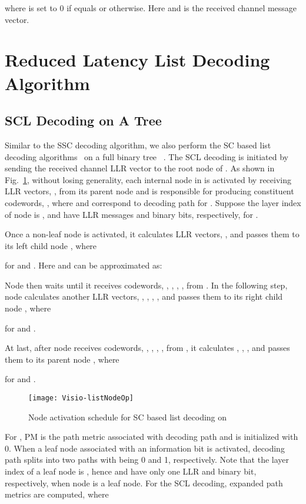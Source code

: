 \documentclass[journal]{IEEEtran}
\begin{document}
where  is set to 0 if  equals  or  otherwise. Here  and  is the received channel message vector.
\section{Reduced Latency List Decoding Algorithm}
\label{sec: rlld}

\subsection{SCL Decoding on A Tree}\label{ssec:node_activation}
Similar to the SSC decoding algorithm, we also perform the SC based list decoding algorithms~\cite{ido_it, tree_list_dec} on a full binary tree ~\cite{jun_sips, gabi_low_latency}. The SCL decoding is initiated by sending the received channel LLR vector to the root node of . As shown in Fig.~\ref{fig: list_node_op}, without losing generality, each internal node  in  is activated by receiving  LLR vectors, , from its parent node  and is responsible for producing  constituent codewords, , where  and  correspond to decoding path  for . Suppose the layer index of node  is ,  and  have  LLR messages and binary bits, respectively, for .

Once a non-leaf node  is activated, it calculates  LLR vectors, , and passes them to its left child node , where

for  and . Here  and can be approximated as:


Node  then waits until it receives  codewords, , , , , from . In the following step, node  calculates another  LLR vectors, , , , , and passes them to its right child node , where

for  and .

At last, after node  receives  codewords, , , , , from , it calculates , , ,  and passes them to its parent node , where

for  and .

\begin{figure} [hbt]
\centering
\texttt{[image: Visio-listNodeOp]}
  \caption{Node activation schedule for SC based list decoding on }\label{fig: list_node_op}
\end{figure}

For , PM is the path metric associated with decoding path  and is initialized with 0.
When a leaf node  associated with an information bit is activated, decoding path  splits into two paths with  being 0 and 1, respectively. Note that the layer index of a leaf node is , hence  and  have only one LLR and binary bit, respectively, when node  is a leaf node. For the SCL decoding,  expanded path metrics are computed, where
\end{document}
